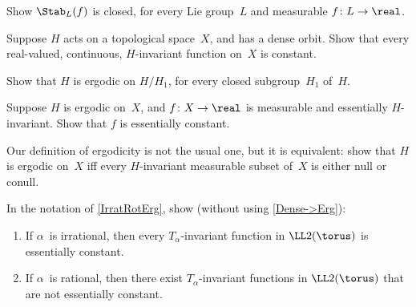 \begin{exercises}

\item \label{EssStabClosed}
Show $\Stab_L(f)$ is closed, for every Lie group~$L$ and measurable $f \colon L \to \real$.

\item \label{DenseOrb->FuncConstEx}
Suppose $H$ acts on a topological space~$X$, and has a dense orbit. Show that every real-valued, continuous, $H$-invariant function on~$X$ is constant.

\item \label{transitive->erg}
Show that $H$ is ergodic on $H/H_1$, for every closed subgroup~$H_1$ of~$H$.

\item \label{EssInvt->EssConst}
Suppose $H$ is ergodic on~$X$, and $f \colon X \to \real$ is measurable and essentially $H$-invariant. Show that $f$ is essentially constant.

\item Our definition of ergodicity is not the usual one, but it is equivalent:
show that $H$ is ergodic on~$X$ iff every $H$-invariant measurable subset of~$X$ is either null or conull. 

\item \label{IrratRotErgEx}
In the notation of \cref{IrratRotErg}, show (without using \cref{Dense->Erg}):
	\begin{enumerate}
	\item If $\alpha$~is irrational, then every $T_\alpha$-invariant function in $\LL2(\torus)$ is essentially constant.
	\item If $\alpha$~is rational, then there exist $T_\alpha$-invariant functions in $\LL2(\torus)$ that are not essentially constant.
	\end{enumerate}


\end{exercises}
